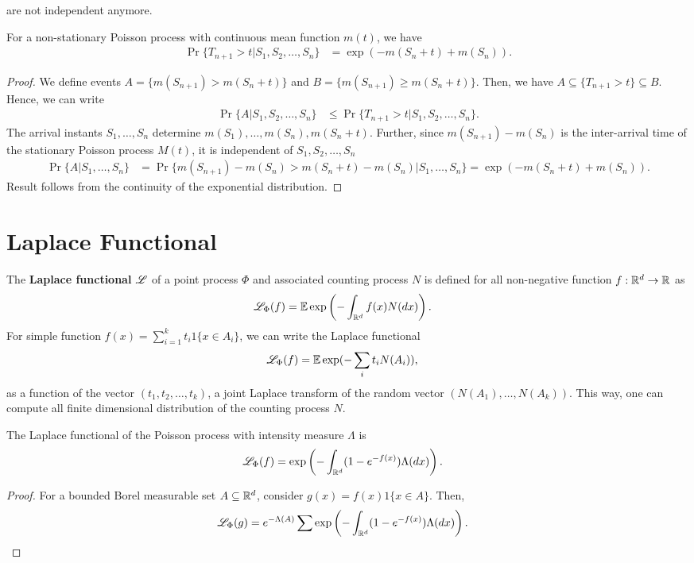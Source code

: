 \documentclass[a4paper,english,10pt]{article}
\begin{document}
are not independent anymore. 
\begin{prop} 
For a non-stationary Poisson process with continuous mean function $m(t)$, we have
\begin{align*}
\Pr\{T_{n+1} > t|S_1, S_2, \dots, S_n\} &= \exp\left(-m(S_n+t) + m(S_n)\right).
\end{align*}
\end{prop}
\begin{proof}
We define events $A = \{m(S_{n+1}) > m(S_n+t)\}$ and $B = \{m(S_{n+1}) \geq m(S_n+t)\}$. 
Then, we have 
$A \subseteq \{T_{n+1} > t\} \subseteq B$.
Hence, we can write 
\begin{align*}
\Pr\{A|S_1, S_2, \dots, S_n\} &\leq \Pr\{T_{n+1} > t |S_1, S_2,\dots, S_n\}.
\end{align*}
The arrival instants $S_1, \dots, S_n$ determine $m(S_1), \dots, m(S_n), m(S_n+t)$. 
Further, since $m(S_{n+1}) - m(S_n)$ is the inter-arrival time of the stationary Poisson process $M(t)$, 
it is independent of $S_1,S_2,\dots, S_n$
\begin{align*}
\Pr\{A|S_1,\dots, S_n\} &= \Pr\{m(S_{n+1})-m(S_n) > m(S_n+t) - m(S_n) |S_1,\dots,S_n\} = \exp\left(-m(S_{n}+t)+m(S_n)\right).
\end{align*}
Result follows from the continuity of the exponential distribution. 
\end{proof}

\section{Laplace Functional}
The \textbf{Laplace functional} $\mathscr{L}$ of a point process $\Phi$ and associated counting process $N$ is defined for all non-negative function $f: \mathbb{R}^d \to \mathbb{R}$ as 
\begin{align*}
\mathscr{L}_{\Phi}(f) &= \mathbb{E} \exp\left(-\int_{\mathbb{R}^d}f(x)N(dx)\right).
\end{align*}
For simple function $f(x) = \sum_{i = 1}^{k}t_i1\{x \in A_i\}$, we can write the Laplace functional 
\begin{align*}
\mathscr{L}_{\Phi}(f) &= \mathbb{E}\exp(-\sum_{i}t_iN(A_i)),
\end{align*}
as a function of the vector $(t_1, t_2, \dots, t_k)$, a joint Laplace transform of the random vector $(N(A_1), \dots, N(A_k))$. 
This way, one can compute all finite dimensional distribution of the counting process $N$. 
\begin{prop}
The Laplace functional of the Poisson process with intensity measure $\Lambda$ is 
\begin{align*}
\mathscr{L}_{\Phi}(f) &= \exp\left(-\int_{\mathbb{R}^d}(1-e^{-f(x)})\Lambda(dx)\right).
\end{align*}  
\end{prop}
\begin{proof}
For a bounded Borel measurable set $A \subseteq \mathbb{R}^d$, consider $g(x) = f(x)1\{x \in A\}$. 
Then,
\begin{align*}
\mathscr{L}_{\Phi}(g) &= e^{-\Lambda(A)}\sum\exp\left(-\int_{\mathbb{R}^d}(1-e^{-f(x)})\Lambda(dx)\right).
\end{align*}  
\end{proof}
\end{document}
